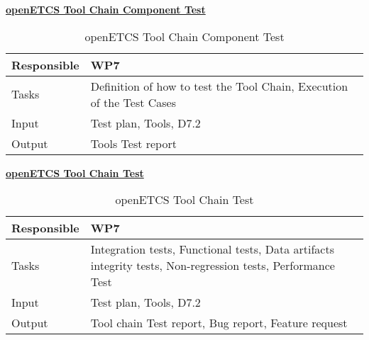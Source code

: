 \documentclass{template/openetcs_article}
\begin{document}
\underline{\textbf{openETCS Tool Chain Component Test}}
\begin{table}[H]
	\begin{center}
		\begin{supertabular}[H]{|p{6cm}|p{8cm}|}
			\hline
			
			Responsible &
			WP7 \\
			\hline
			
			Tasks &
			Definition of how to test the Tool Chain,
			Execution of the Test Cases \\	\hline
			
			Input &
			Test plan,
			Tools,
			D7.2\\
			\hline
			
			Output &
			Tools Test report\\
			\hline
			
		\end{supertabular}
	\end{center}
	\caption{openETCS Tool Chain Component Test}
\end{table}


\underline{\textbf{openETCS Tool Chain Test}}
\begin{table}[H]
	\begin{center}
		\tablehead{%
			}
		
		\begin{supertabular}[H]{|p{6cm}|p{8cm}|}
			\hline

			Responsible &
			WP7 \\\hline

			Tasks &
			Integration tests,
			Functional tests,
			Data artifacts integrity tests,
			Non-regression tests,
			Performance Test \\
			\hline

			Input &
			Test plan,
			Tools,
			D7.2\\
			\hline

			Output &
			Tool chain Test report,
			Bug report,
			Feature request\\
			\hline

			\hline	
		\end{supertabular}
	\end{center}
	\caption{openETCS Tool Chain Test}
\end{table}
\end{document}
